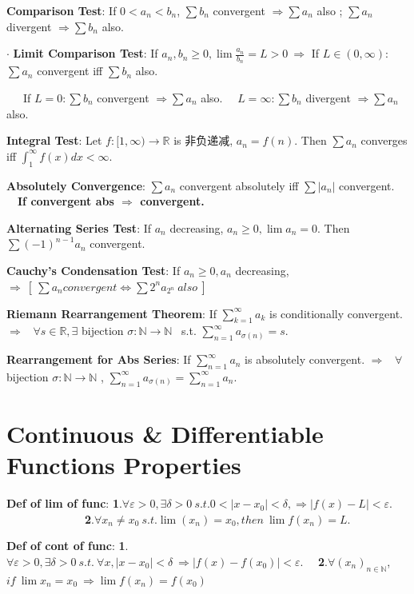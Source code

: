 \documentclass[9pt]{article}
\begin{document}
\textbf{Comparison Test}: If $0<a_n<b_n$, $\sum b_n$ convergent $\Rightarrow \sum a_n$ also ; $\sum a_n$ divergent $\Rightarrow \sum b_n$ also.

$\cdot$ \textbf{Limit Comparison Test}: If $a_n,b_n\geq 0,\lim \frac{a_n}{b_n}=L>0 \ \Rightarrow$ If $L\in(0,\infty)$: $\sum a_n$ convergent iff $\sum b_n$ also.

\ \ \  If $L=0 : \sum b_n$ convergent $\Rightarrow \sum a_n$ also. \ \ $L=\infty : \sum b_n$ divergent $\Rightarrow \sum a_n$ also.

\textbf{Integral Test}: Let $f:[1,\infty)\rightarrow\mathbb{R}$ is 非负递减, $a_n=f(n)$. Then $\sum a_n$ converges iff $\int_{1}^{\infty}f(x)dx<\infty.$

\textbf{Absolutely Convergence}: $\sum a_n$ convergent absolutely iff $\sum |a_n|$ convergent. \ \ \textbf{If convergent abs $\Rightarrow$ convergent.}

\textbf{Alternating Series Test}: If $a_n$ decreasing, $a_n\geq 0,\lim a_n = 0$. Then $\sum (-1)^{n-1}a_n$ convergent.

\textbf{Cauchy's Condensation Test}: If $a_n\geq 0,a_n$ decreasing, $\Rightarrow \ [\ \sum a_n convergent \Leftrightarrow \sum 2^na_{2^n} \ also \ ]$

\textbf{Riemann Rearrangement Theorem}: If $\sum^\infty_{k=1}a_k$ is conditionally convergent. $\Rightarrow$ \ $\forall s\in\mathbb{R},\exists$ bijection $\sigma:\mathbb{N}\to\mathbb{N}$ \ s.t. $\sum_{n=1}^{\infty}a_{\sigma(n)}=s$.

\textbf{Rearrangement for Abs Series}: If $\sum_{n=1}^{\infty}a_n$ is absolutely convergent. $\Rightarrow$ \ $\forall$ bijection $\sigma:\mathbb{N}\to\mathbb{N}$ , $\sum_{n=1}^{\infty}a_{\sigma(n)}=\sum_{n=1}^{\infty}a_n$.


\section{Continuous \& Differentiable Functions Properties}

\textbf{Def of lim of func}: {\footnotesize \textbf{1}.$\forall\varepsilon>0,\exists\delta>0 \ s.t. 0<|x-x_0|<\delta, \Rightarrow |f(x)-L|<\varepsilon.$ \ \ \ \ \ \ \ \ \ \ \ \ \ \ \textbf{2}.$\forall x_n\ne x_0 \ s.t. \lim (x_n)=x_0, then \ \lim f(x_n)=L$.}

\textbf{Def of cont of func}: {\footnotesize \textbf{1}.$\forall\varepsilon>0,\exists\delta>0 \ s.t. \ \forall x,|x-x_0|<\delta \ \Rightarrow |f(x)-f(x_0)|<\varepsilon.$ \ \ \textbf{2}.$\forall (x_n)_{n\in \mathbb{N}}$,$if \ \lim x_n = x_0 \ \Rightarrow \lim f(x_n)=f(x_0)$}
\end{document}
